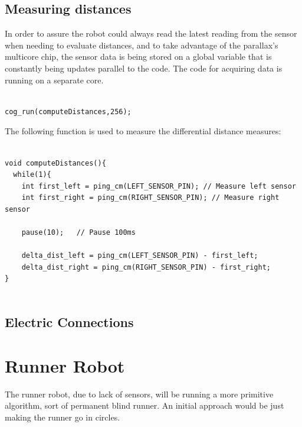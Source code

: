 \documentclass{report}
\begin{document}
\subsection{Measuring distances}

In order to assure the robot could always read the latest reading from the
sensor when needing to evaluate distances, and to take advantage of the
parallax's multicore chip, the sensor data is being stored on a global variable
that is constantly being updates parallel to the code. The code for acquiring
data is running on a separate core. 

\begin{lstlisting}[style = C_style]

cog_run(computeDistances,256);

\end{lstlisting}

The following function is used to measure the differential distance measures:
\begin{lstlisting}[style = C_style]

void computeDistances(){
  while(1){
    int first_left = ping_cm(LEFT_SENSOR_PIN); // Measure left sensor
    int first_right = ping_cm(RIGHT_SENSOR_PIN); // Measure right sensor

    pause(10);   // Pause 100ms                     
    
    delta_dist_left = ping_cm(LEFT_SENSOR_PIN) - first_left;
    delta_dist_right = ping_cm(RIGHT_SENSOR_PIN) - first_right;
}
 
\end{lstlisting}


\subsection{Electric Connections}

\section{Runner Robot}

The runner robot, due to lack of sensors, will be running a more primitive
algorithm, sort of permanent blind runner. An initial approach would be
just making the runner go in circles.







\end{document}
